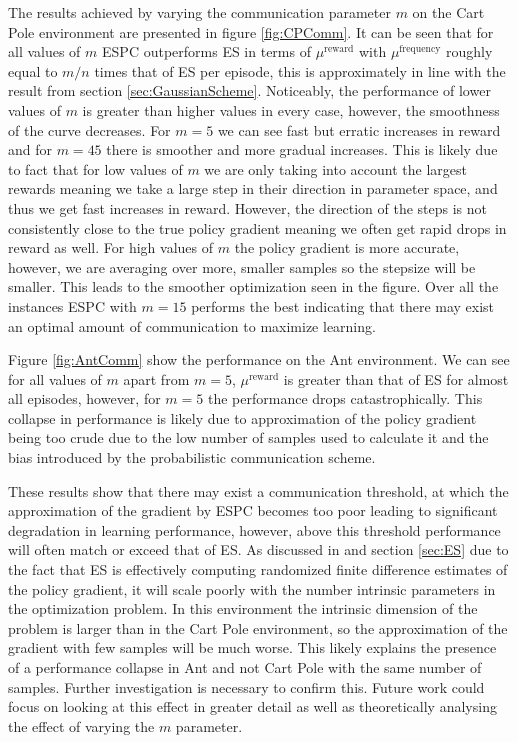 The results achieved by varying the communication parameter $m$ on the Cart Pole environment are presented in figure \ref{fig:CPComm}. It can be seen that for all values of $m$ ESPC outperforms ES in terms of $\mu^{\text{reward}}$ with $\mu^{\text{frequency}}$ roughly equal to $m/n$ times that of ES per episode, this is approximately in line with the result from section \ref{sec:GaussianScheme}. Noticeably, the performance of lower values of $m$ is greater than higher values in every case, however, the smoothness of the curve decreases. For $m=5$ we can see fast but erratic increases in reward and for $m=45$ there is smoother and more gradual increases. This is likely due to fact that for low values of $m$ we are only taking into account the largest rewards meaning we take a large step in their direction in parameter space, and thus we get fast increases in reward. However, the direction of the steps is not consistently close to the true policy gradient meaning we often get rapid drops in reward as well. For high values of $m$ the policy gradient is more accurate, however, we are averaging over more, smaller samples so the stepsize will be smaller. This leads to the smoother optimization seen in the figure. Over all the instances ESPC with $m=15$ performs the best indicating that there may exist an optimal amount of communication to maximize learning. 

Figure \ref{fig:AntComm} show the performance on the Ant environment. We can see for all values of $m$ apart from $m=5$, $\mu^{\text{reward}}$ is greater than that of ES for almost all episodes, however, for $m=5$ the performance drops catastrophically. This collapse in performance is likely due to approximation of the policy gradient being too crude due to the low number of samples used to calculate it and the bias introduced by the probabilistic communication scheme. 

These results show that there may exist a communication threshold, at which the approximation of the gradient by ESPC becomes too poor leading to significant degradation in learning performance, however, above this threshold performance will often match or exceed that of ES. 
As discussed in \cite{ES} and section \ref{sec:ES} due to the fact that ES is effectively computing randomized finite difference estimates of the policy gradient, it will scale poorly with the number intrinsic parameters in the optimization problem.
In this environment the intrinsic dimension of the problem is larger than in the Cart Pole environment, so the approximation of the gradient with few samples will be much worse. This likely explains the presence of a performance collapse in Ant and not Cart Pole with the same number of samples.
Further investigation is necessary to confirm this. Future work could focus on looking at this effect in greater detail as well as theoretically analysing the effect of varying the $m$ parameter.

